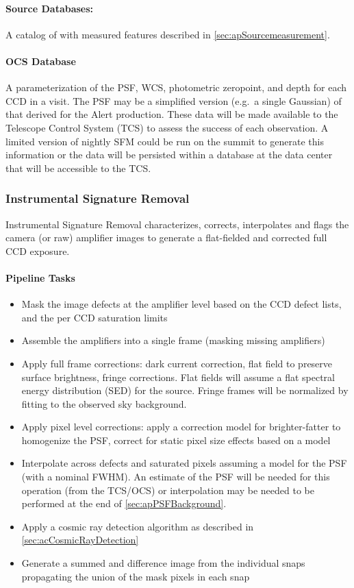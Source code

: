 \paragraph*{Source Databases:} A catalog of \Sources with measured features described in \ref{sec:apSourcemeasurement}.

\paragraph*{OCS Database} A parameterization of the PSF, WCS, photometric zeropoint, and depth for each CCD in a visit. The PSF may be a simplified version (e.g.\ a single Gaussian) of that derived for the Alert production. These data will be made available to the Telescope Control System (TCS) to assess the success of each observation. A limited version of nightly SFM could be run on the summit to generate this information or the  data will be persisted within a database at the data center that will be accessible to the TCS.


\subsubsection{Instrumental Signature Removal}
\label{sec:apISR}
Instrumental Signature Removal characterizes, corrects, interpolates and flags the camera (or raw) amplifier images to generate a flat-fielded and corrected full CCD exposure.

\paragraph{Pipeline Tasks}
\begin{itemize}
\item Mask the image defects at the amplifier level based on the CCD defect lists, and the per CCD saturation limits
\item Assemble the amplifiers into a single frame (masking missing amplifiers)
\item Apply full frame corrections: dark current correction, flat field to preserve surface brightness, fringe corrections. Flat fields will assume a flat spectral energy distribution (SED) for the source. Fringe frames will be normalized by fitting to the observed sky background.
\item Apply pixel level corrections: apply a correction model for brighter-fatter to homogenize the PSF, correct for static pixel size effects based on a model
\item Interpolate across defects and saturated pixels assuming a model for the PSF (with a nominal FWHM). An estimate of the PSF will be needed for this operation (from the TCS/OCS) or interpolation may be needed to be performed at the end of \ref{sec:apPSFBackground}.
\item Apply a cosmic ray detection algorithm as described in \ref{sec:acCosmicRayDetection}
\item Generate a summed and difference image from the individual snaps propagating the union of the mask pixels in each snap
\end{itemize}

